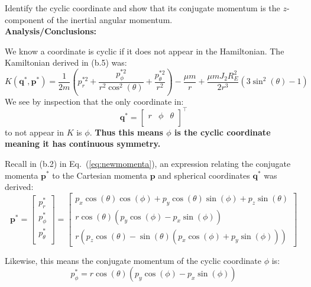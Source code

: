 \documentclass[titlepage]{article}
\begin{document}
Identify the cyclic coordinate and show that its conjugate momentum is the $z$-component of the inertial angular momentum. \\

\textbf{Analysis/Conclusions:} \\

\begin{mdframed}[linewidth=1pt, innertopmargin=10pt, innerbottommargin=10pt]
	We know a coordinate is cyclic if it does not appear in the Hamiltonian. The Kamiltonian derived in (b.5) was:
	\begin{equation}
		K(\boldsymbol{q}^*,\boldsymbol{p}^*)=\frac{1}{2m}\left(p_r^{*2}+\frac{p_\phi^{*2}}{r^2\cos^2(\theta)}+\frac{p_\theta^{*2}}{r^2}\right)-\frac{\mu m}{r}+\frac{\mu mJ_2R_E^2}{2r^3}\left(3\sin^2(\theta)-1\right)
	\end{equation}
	We see by inspection that the only coordinate in:
	\begin{equation}
		\boldsymbol{q}^*=
		\begin{bmatrix}
			r & \phi & \theta \\
		\end{bmatrix}^\top
	\end{equation}
	to not appear in $K$ is $\phi$. \textbf{Thus this means $\phi$ is the cyclic coordinate meaning it has continuous symmetry.}
\end{mdframed}

Recall in (b.2) in Eq.~(\ref{eq:newmomenta}), an expression relating the conjugate momenta $\boldsymbol{p}^*$ to the Cartesian momenta $\boldsymbol{p}$ and spherical coordinates $\boldsymbol{q}^*$ was derived:
\begin{equation}
	\boldsymbol{p}^*=
	\begin{bmatrix}
		p_r^* \\
		p_\phi^* \\
		p_\theta^* \\
	\end{bmatrix}=
	\begin{bmatrix}
		p_x\cos(\theta)\cos(\phi)+p_y\cos(\theta)\sin(\phi)+p_z\sin(\theta) \\
		r\cos(\theta)\left(p_y\cos(\phi)-p_x\sin(\phi)\right) \\
		r\left(p_z\cos(\theta)-\sin(\theta)\left(p_x\cos(\phi)+p_y\sin(\phi)\right)\right)
	\end{bmatrix}
\end{equation}

Likewise, this means the conjugate momentum of the cyclic coordinate $\phi$ is:
\begin{equation}
	p_\phi^*=r\cos(\theta)\left(p_y\cos(\phi)-p_x\sin(\phi)\right)
\end{equation}
\end{document}
